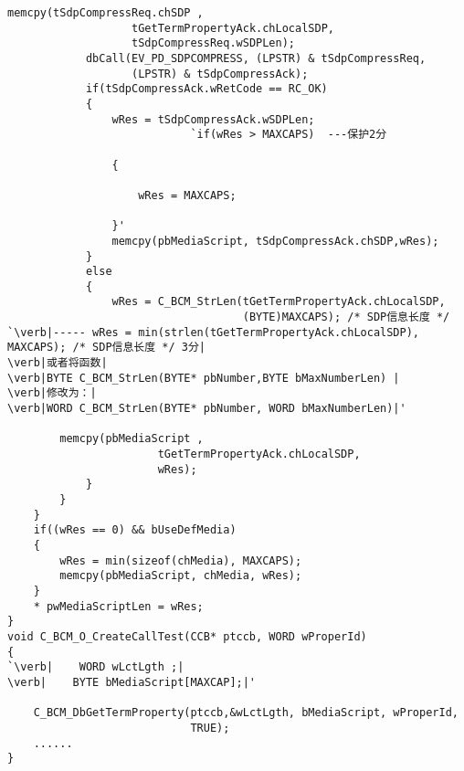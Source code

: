﻿\documentclass  [11pt,onecolumn,a4paper]{article}
\begin{document}
\begin{lstlisting}[escapeinside=`']
			memcpy(tSdpCompressReq.chSDP ,
                   tGetTermPropertyAck.chLocalSDP,
                   tSdpCompressReq.wSDPLen);
			dbCall(EV_PD_SDPCOMPRESS, (LPSTR) & tSdpCompressReq,
                   (LPSTR) & tSdpCompressAck);
			if(tSdpCompressAck.wRetCode == RC_OK)
			{
				wRes = tSdpCompressAck.wSDPLen;
                            `if(wRes > MAXCAPS)  ---保护2分

				{

					wRes = MAXCAPS;

				}'
				memcpy(pbMediaScript, tSdpCompressAck.chSDP,wRes);
			}
			else
			{
                wRes = C_BCM_StrLen(tGetTermPropertyAck.chLocalSDP,
                                    (BYTE)MAXCAPS); /* SDP信息长度 */
`\verb|----- wRes = min(strlen(tGetTermPropertyAck.chLocalSDP), MAXCAPS); /* SDP信息长度 */ 3分|
\verb|或者将函数|
\verb|BYTE C_BCM_StrLen(BYTE* pbNumber,BYTE bMaxNumberLen) |
\verb|修改为：|
\verb|WORD C_BCM_StrLen(BYTE* pbNumber, WORD bMaxNumberLen)|'

		memcpy(pbMediaScript ,
                       tGetTermPropertyAck.chLocalSDP,
                       wRes);
			}
		}
	}
	if((wRes == 0) && bUseDefMedia)
	{
		wRes = min(sizeof(chMedia), MAXCAPS);
		memcpy(pbMediaScript, chMedia, wRes);
	}
	* pwMediaScriptLen = wRes;
}
void C_BCM_O_CreateCallTest(CCB* ptccb, WORD wProperId)
{
`\verb|    WORD wLctLgth ;|
\verb|    BYTE bMediaScript[MAXCAP];|'
    
    C_BCM_DbGetTermProperty(ptccb,&wLctLgth, bMediaScript, wProperId,
                            TRUE);
    ......
}
\end{lstlisting}
\pagebreak
\end{document}
